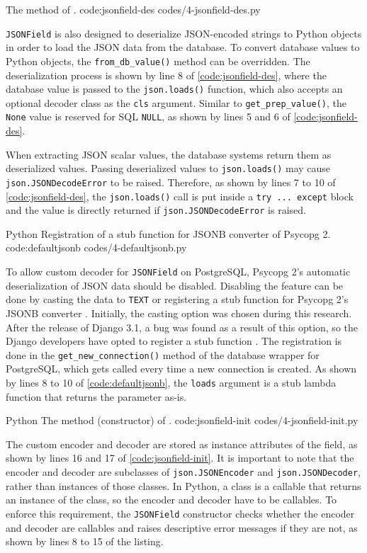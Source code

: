 {The  method of .}
{code:jsonfield-des}
{codes/4-jsonfield-des.py}

\verb|JSONField| is also designed to deserialize JSON-encoded strings to Python
objects in order to load the JSON data from the database. To convert database
values to Python objects, the \verb|from_db_value()| method can be overridden.
The deserialization process is shown by line 8 of \autoref{code:jsonfield-des},
where the database value is passed to the \verb|json.loads()| function, which
also accepts an optional decoder class as the \verb|cls| argument. Similar to
\verb|get_prep_value()|, the \verb|None| value is reserved for SQL \verb|NULL|,
as shown by lines 5 and 6 of \autoref{code:jsonfield-des}.

When extracting JSON scalar values, the database systems return them as
deserialized values. Passing deserialized values to \verb|json.loads()| may
cause \verb|json.JSONDecodeError| to be raised. Therefore, as shown by lines 7
to 10 of \autoref{code:jsonfield-des}, the \verb|json.loads()| call is put
inside a \verb|try ... except| block and the value is directly returned if
\verb|json.JSONDecodeError| is raised.

\listing
{Python}
{Registration of a stub function for JSONB converter of Psycopg 2.}
{code:defaultjsonb}
{codes/4-defaultjsonb.py}

To allow custom decoder for \verb|JSONField| on PostgreSQL, Psycopg 2's
automatic deserialization of JSON data should be disabled. Disabling the
feature can be done by casting the data to \verb|TEXT| or registering a stub
function for Psycopg 2's JSONB converter \cite{psycopg2:json-adaptation}.
Initially, the casting option was chosen during this research. After the
release of Django 3.1, a bug was found as a result of this option, so the
Django developers have opted to register a stub function \cite{ticket_31956}.
The registration is done in the \verb|get_new_connection()| method of the
database wrapper for PostgreSQL, which gets called every time a new connection
is created. As shown by lines 8 to 10 of \autoref{code:defaultjsonb}, the
\verb|loads| argument is a stub lambda function that returns the parameter
as-is.

\listing
{Python}
{The  method (constructor) of .}
{code:jsonfield-init}
{codes/4-jsonfield-init.py}

The custom encoder and decoder are stored as instance attributes of the field,
as shown by lines 16 and 17 of \autoref{code:jsonfield-init}. It is important
to note that the encoder and decoder are subclasses of \verb|json.JSONEncoder|
and \verb|json.JSONDecoder|, rather than instances of those classes. In Python,
a class is a callable that returns an instance of the class, so the encoder and
decoder have to be callables. To enforce this requirement, the \verb|JSONField|
constructor checks whether the encoder and decoder are callables and raises
descriptive error messages if they are not, as shown by lines 8 to 15 of the
listing.

